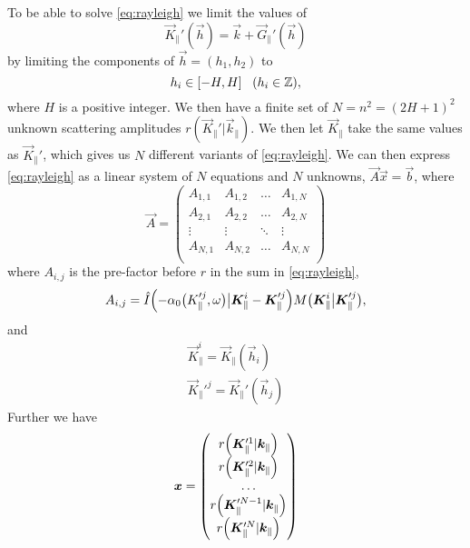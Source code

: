 To be able to solve \cref{eq:rayleigh} we limit the values of
\begin{equation}
    \vec K_{\|}'(\vec h) = \vec k + \vec G_\|'(\vec h)
\end{equation}
by limiting the components of $\vec h = (h_1, h_2)$ to
\begin{equation}
    h_i \in \sbr{-H, H} ~~(h_i \in \mathbb{Z}),
\end{equation}
where $H$ is a positive integer. We then have a finite set of $N = n^2 = (2H+1)^2$ unknown scattering amplitudes $r(\vec K_\|' \big\vert \vec k_\|)$. We then let $\vec K_\|$ take the same values as $\vec K_\|'$, which gives us $N$ different variants of \cref{eq:rayleigh}. We can then express \cref{eq:rayleigh} as a linear system of $N$ equations and $N$ unknowns, $\vec A \vec x = \vec b$, where
\begin{equation}
    \vec A =
    \begin{pmatrix}
        A_{1,1} & A_{1,2} & \dots  & A_{1,N} \\
        A_{2,1} & A_{2,2} & \dots  & A_{2,N} \\
        \vdots  & \vdots  & \ddots & \vdots  \\
        A_{N,1} & A_{N,2} & \dots  & A_{N,N} \\
    \end{pmatrix}
    \label{eq:theMatrix}
\end{equation}
where $A_{i, j}$ is the pre-factor before $r$ in the sum in \cref{eq:rayleigh},
\begin{equation}
    A_{i, j} = \hat I\del[2]{-\alpha_0 \del[1]{K_{\|}'^j, \omega} \big\vert \vec K_{\|}^i - \vec K_{\|}'^j} M\del[1]{\vec K_{\|}^i \big\vert \vec K_{\|}'^j},
\end{equation}
and
\begin{align}
    \vec K_\|^{i} = \vec K_\| (\vec h_i) \\
    \vec K_\|'^{j} = \vec K_\|' (\vec h_j)
\end{align}
Further we have
\begin{equation}
    \vec x =
    \begin{pmatrix}
        r\del[2]{\vec K_\|'^{1} \vert \vec k_\|} \\
        r\del[2]{\vec K_\|'^{2} \vert \vec k_\|} \\
        \hdots \\
        r\del[2]{\vec K_\|'^{N-1} \vert \vec k_\|} \\
        r\del[2]{\vec K_\|'^{N} \vert \vec k_\|}
    \end{pmatrix}
\end{equation}
